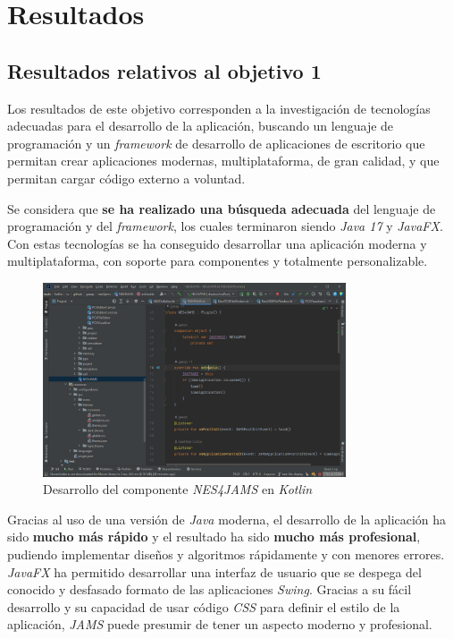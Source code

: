 \chapter{Resultados}\label{ch:resultados}


\section{Resultados relativos al objetivo 1}\label{sec:resultados-relativos-al-objetivo-1}

Los resultados de este objetivo corresponden a la investigación de
tecnologías adecuadas para el desarrollo de la aplicación,
buscando un lenguaje de programación y un \textit{framework} de
desarrollo de aplicaciones de escritorio que permitan crear
aplicaciones modernas, multiplataforma, de gran calidad,
y que permitan cargar código externo a voluntad.

Se considera que \textbf{se ha realizado una búsqueda adecuada}
del lenguaje de programación y del \textit{framework}, los cuales
terminaron siendo \textit{Java 17} y \textit{JavaFX}.
Con estas tecnologías se ha conseguido desarrollar una aplicación
moderna y multiplataforma, con soporte para componentes y totalmente
personalizable.

\begin{figure}[h]
    \centering
    \includegraphics[width=0.8\textwidth]{images/result/idea-plugin}
    \caption{Desarrollo del componente \textit{NES4JAMS} en \textit{Kotlin}}
    \label{fig:jams-plugin}
\end{figure}

Gracias al uso de una versión de \textit{Java} moderna,
el desarrollo de la aplicación ha sido \textbf{mucho más rápido} y el resultado
ha sido \textbf{mucho más profesional}, pudiendo implementar diseños y
algoritmos rápidamente y con menores errores.
\textit{JavaFX} ha permitido desarrollar una interfaz de usuario
que se despega del conocido y desfasado formato de las aplicaciones
\textit{Swing}.
Gracias a su fácil desarrollo y su capacidad de usar código
\textit{CSS} para definir el estilo de la aplicación, \textit{JAMS}
puede presumir de tener un aspecto moderno y profesional.

